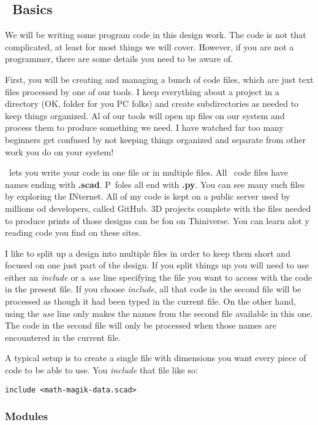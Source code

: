 \subsection{\osc\ Basics}

We will be writing some program code in this design work. The code is not that
complicated, at least for most things we will cover. However, if you are not a
programmer, there are some details you need to be aware of.

First, you will be creating and managing a bunch of code files, which are just
text files processed by one of our tools. I keep everything about a project in
a directory (OK, folder for you PC folks) and create subdirectories as needed
to keep things organized. Al of our tools will open up files on our system and
process them to produce something we need. I have watched far too many
beginners get confused by not keeping things organized and separate from other
work you do on your system!

\osc\ lets you write your code in one file or in multiple files. All \osc\ code
files have names ending with {\bf .scad}. P\PY\ foles all end with {\bf .py}.
You can see many such files by exploring the INternet. All of my code is kept
on a public server used by millions od developers, called GitHub. 3D projects
complete with the files needed to produce prints of those designs can be fon on
Thiniverse. You can learn alot y reading code you find on these sites.

I like to split up a design into multiple files in order to keep them short and
focused on one just part of the design. If you split things up you will need to
use either an {\it include} or a {\it use} line specifying the file you want to
access with the code in the present file. If you choose {\it include}, all that
code in the second file will be processed as though it had been typed in the
current file.  On the other hand, using the {\it use} line only makes the names
from the second file available in this one. The code in the second file will
only be processed when those names are encountered in the current file.

A typical setup is to create a single file with dimensions you want every piece
of code to be able to use. You {\it include} that file like so:

\begin{lstlisting}
include <math-magik-data.scad>
\end{lstlisting}

\subsubsection{Modules}

